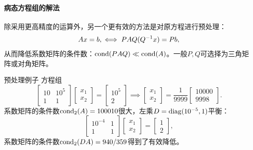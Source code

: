 \paragraph{病态方程组的解法}

除采用更高精度的运算外，另一个更有效的方法是对原方程进行预处理：
\[
    Ax=b,\iff PAQ(Q^{-1} x)=Pb,
\]
从而降低系数矩阵的条件数：$\operatorname{cond}(PAQ)\ll\operatorname{cond}(A)$。一般$P,Q$可选择为三角矩阵或对角矩阵。

\begin{example}
    {预处理例子}{}
    方程组
    \[
        \begin{bmatrix}
            10&10^5\\1&1
        \end{bmatrix}\begin{bmatrix}
            x_1\\x_2
        \end{bmatrix}=\begin{bmatrix}
            10^5\\2
        \end{bmatrix}\implies\begin{bmatrix}
            x_1\\x_2
        \end{bmatrix}=\frac1{9999}\begin{bmatrix}
            10000\\9998
        \end{bmatrix}.
    \]
    系数矩阵的条件数$\operatorname{cond}_2(A)=100010$很大，左乘$D=\operatorname{diag}(10^{-5},1)$平衡：
    \[
        \begin{bmatrix}
            10^{-4}&1\\1&1
        \end{bmatrix}\begin{bmatrix}
            x_1\\x_2
        \end{bmatrix}=\begin{bmatrix}
            1\\2
        \end{bmatrix},
    \]
    系数矩阵的条件数$\operatorname{cond}_2(DA)=940/359$得到了有效降低。
\end{example}

